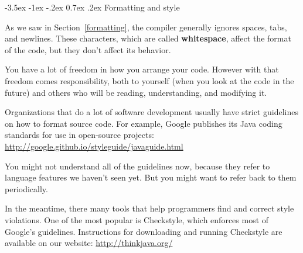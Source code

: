 \documentclass[12pt]{book}
\makeatletter
\theoremstyle{exercise}
\renewcommand{\section}{\@startsection{section}{1}{\z@}%
    {-3.5ex \@plus -1ex \@minus -.2ex}%
    {0.7ex \@plus.2ex}%
    {\normalfont\Large\bfseries}}
\makeatother
\begin{document}


\section{Formatting and style}


As we saw in Section~\ref{formatting}, the compiler generally ignores spaces, tabs, and newlines.
These characters, which are called {\bf whitespace}, affect the format of the code, but they don't affect its behavior.

You have a lot of freedom in how you arrange your code.
However with that freedom comes responsibility, both to yourself (when you look at the code in the future) and others who will be reading, understanding, and modifying it.


Organizations that do a lot of software development usually have strict guidelines on how to format source code.
For example, Google publishes its Java coding standards for use in open-source projects:
\url{http://google.github.io/styleguide/javaguide.html}


You might not understand all of the guidelines now, because they refer to language features we haven't seen yet.
But you might want to refer back to them periodically.

In the meantime, there many tools that help programmers find and correct style violations.
One of the most popular is Checkstyle, which enforces most of Google's guidelines.
Instructions for downloading and running Checkstyle are available on our website: \url{http://thinkjava.org/}

\end{document}
